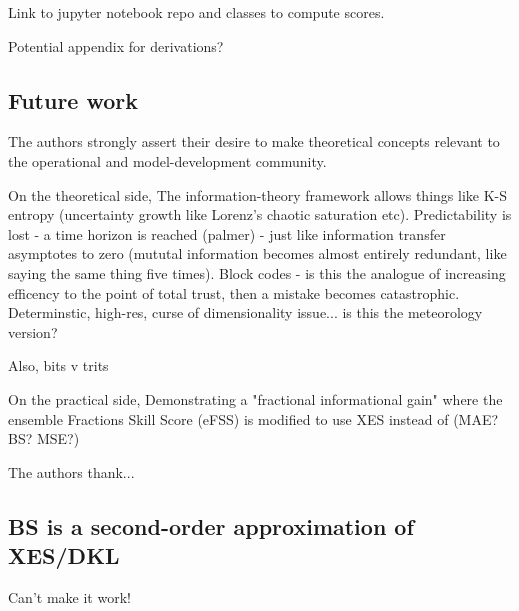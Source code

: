 \documentclass[draft]{ametsoc}
\begin{document}
Link to jupyter notebook repo and classes to compute scores.

Potential appendix for derivations?

\subsection{Future work}
The authors strongly assert their desire to make theoretical concepts relevant to the operational and model-development community. 

On the theoretical side, The information-theory framework allows things like K-S entropy (uncertainty growth like Lorenz's chaotic saturation etc). Predictability is lost - a time horizon is reached (palmer) - just like information transfer asymptotes to zero (mututal information becomes almost entirely redundant, like saying the same thing five times). Block codes - is this the analogue of increasing efficency to the point of total trust, then a mistake becomes catastrophic. Determinstic, high-res, curse of dimensionality issue... is this the meteorology version?

Also, bits v trits

On the practical side, Demonstrating a "fractional informational gain" where the ensemble Fractions Skill Score (eFSS) is modified to use XES instead of (MAE? BS? MSE?)

%
\acknowledgments
The authors thank...

%
\appendix



\subsection{BS is a second-order approximation of XES/DKL}
Can't make it work!
\end{document}
